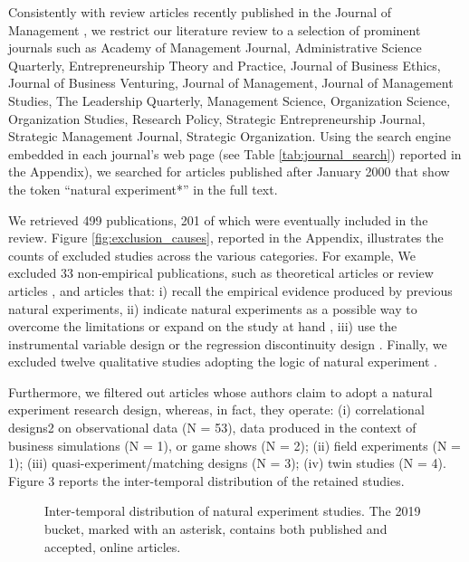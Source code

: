 Consistently with review articles recently published in the Journal of
Management \parencite[e.g.][]{gonzalez2018,rindova2018}, we restrict our
literature review to a selection of prominent journals such as Academy of
Management Journal, Administrative Science Quarterly, Entrepreneurship Theory
and Practice, Journal of Business Ethics, Journal of Business Venturing, Journal
of Management, Journal of Management Studies, The Leadership Quarterly,
Management Science, Organization Science, Organization Studies, Research Policy,
Strategic Entrepreneurship Journal, Strategic Management Journal, Strategic
Organization.  Using the search engine embedded in each journal's web page (see
Table \ref{tab:journal_search}) reported in the Appendix), we searched for
articles published after January 2000 that show the token ``natural
experiment*'' in the full text.

We retrieved 499 publications, 201 of which were eventually included in the
review. Figure \ref{fig:exclusion_causes}, reported in the Appendix, illustrates
the counts of excluded studies across the various categories. For example,
 We excluded 33 non-empirical publications, such as theoretical articles
\parencite[e.g.,][]{makadok2011} or review articles
\parencite[e.g.,][]{shaver2020}, and articles that: i) recall the empirical
evidence produced by previous natural experiments, ii) indicate natural
experiments as a possible way to overcome the limitations or expand on the study
at hand \parencite[e.g.,][]{hsu2006}, iii) use the instrumental variable design
\parencite[e.g.,][]{zoloty2018} or the regression discontinuity design
\parencite[e.g.,][]{flammer2015}. Finally, we excluded twelve qualitative studies
adopting the logic of natural experiment \parencite[e.g.,][]{powell2017}.

Furthermore, we filtered out articles whose authors claim to adopt a natural
experiment research design, whereas, in fact, they operate: (i) correlational
designs2 on observational data (N = 53), data produced in the context of
business simulations (N = 1), or game shows (N = 2); (ii) field experiments (N =
1); (iii) quasi-experiment/matching designs (N = 3); (iv) twin studies (N = 4).
Figure 3 reports the inter-temporal distribution of the retained studies.

\begin{figure}[]
    \centering
    
    \caption{Inter-temporal distribution of natural experiment studies.
    The 2019 bucket, marked with an asterisk, contains both published and 
    accepted, online articles.}
    \label{fig:studies_over_time}
\end{figure}

